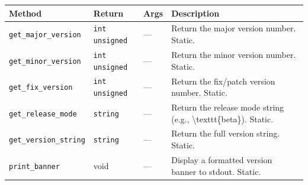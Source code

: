 \documentclass[11pt,letterpaper]{report}
\begin{document}
\begin{xltabular}{\linewidth}{>{\small}p{1.35in} >{\small}p{1.25in} >{\small}p{0.95in} >{\small}X}
\toprule
\textbf{Method} & \textbf{Return} & \textbf{Args} & \textbf{Description} \\
\midrule
\endhead
\bottomrule
\endfoot
\texttt{get\_major\_version} & \texttt{int unsigned} & --- & Return the major version number. Static. \\
\texttt{get\_minor\_version} & \texttt{int unsigned} & --- & Return the minor version number. Static. \\
\texttt{get\_fix\_version} & \texttt{int unsigned} & --- & Return the fix/patch version number. Static. \\
\texttt{get\_release\_mode} & \texttt{string} & --- & Return the release mode string (e.g., \textbackslash{}texttt\{beta\}). Static. \\
\texttt{get\_version\_string} & \texttt{string} & --- & Return the full version string. Static. \\
\texttt{print\_banner} & void & --- & Display a formatted version banner to stdout. Static. \\
\end{xltabular}
\end{document}
